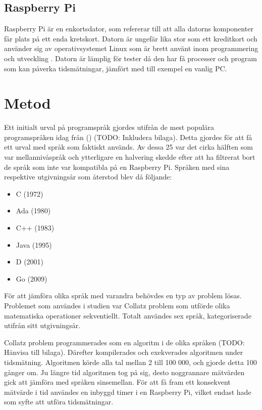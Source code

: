 \documentclass[12pt,swedish]{article}
\begin{document}
\subsection{Raspberry Pi}
Raspberry Pi är en enkortsdator, som refererar till att alla datorns komponenter får plats på ett enda kretskort. Datorn är ungefär lika stor som ett kreditkort och använder sig av operativsystemet Linux som är brett använt inom programmering och utveckling \citep{andrews_2013}. Datorn är lämplig för tester då den har få processer och program som kan påverka tidsmätningar, jämfört med till exempel en vanlig PC.


\newpage
\section{Metod}
Ett initialt urval på programspråk gjordes utifrån de mest populära programspråken idag från  (\citeyear{tiobe}) (TODO: Inkludera bilaga). Detta gjordes för att få ett urval med språk som faktiskt används. Av dessa 25 var det cirka hälften som var mellannivåspråk och ytterligare en halvering skedde efter att ha filtrerat bort de språk som inte var kompatibla på en Raspberry Pi. Språken med sina respektive utgivningsår som återstod blev då följande:

\begin{itemize}
    \item C (1972)
    \item Ada (1980)
    \item C++ (1983)
    \item Java (1995)
    \item D (2001)
    \item Go (2009)
\end{itemize}
För att jämföra olika språk med varandra behövdes en typ av problem lösas. Problemet som användes i studien var Collatz problem som utförde olika matematiska operationer sekventiellt. Totalt användes sex språk, kategoriserade utifrån sitt utgivningsår.

Collatz problem programmerades som en algoritm i de olika språken (TODO: Hänvisa till bilaga).
Därefter kompilerades och exekverades algoritmen under tidsmätning. Algoritmen körde alla tal mellan 2 till 100 000, och gjorde detta 100 gånger om. Ju längre tid algoritmen tog på sig, desto noggrannare mätvärden gick att jämföra med språken sinsemellan. För att få fram ett konsekvent mätvärde i tid användes en inbyggd timer i en Raspberry Pi, vilket endast hade som syfte att utföra tidsmätningar.
\end{document}
